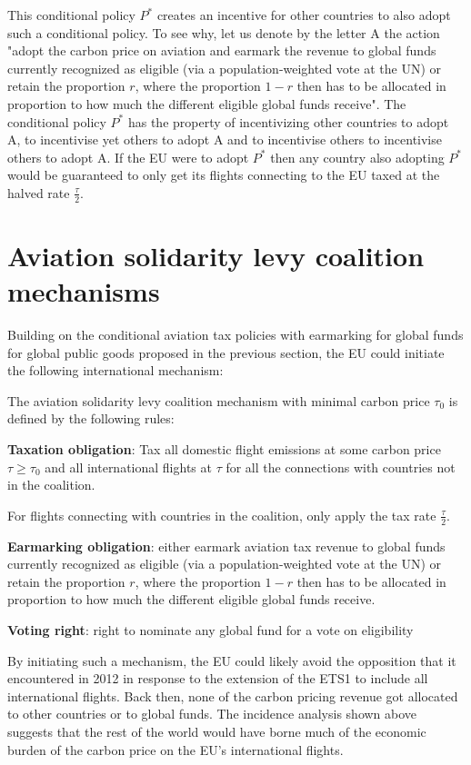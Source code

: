 This conditional policy $P^*$ creates an incentive for other countries to also adopt such a conditional policy. To see why, let us denote by the letter A the action "adopt the carbon price on aviation and earmark the revenue to global funds currently recognized as eligible (via a population-weighted vote at the UN) or retain the proportion $r$, where the proportion $1-r$ then has to be allocated in proportion to how much the different eligible global funds receive". The conditional policy $P^*$ has the property of incentivizing other countries to adopt A, to incentivise yet others to adopt A and to incentivise others to incentivise others to adopt A. If the EU were to adopt $P^*$ then any country also adopting $P^*$  would be guaranteed to only get its flights connecting to the EU taxed at the halved rate $\frac{\tau}{2}$.

    
\section{Aviation solidarity levy coalition mechanisms}

Building on the conditional aviation tax policies with earmarking for global funds for global public goods proposed in the previous section, the EU could initiate the following international mechanism:

\begin{definition}
The aviation solidarity levy coalition mechanism with minimal carbon price $\tau_0$ is defined by the following rules:

\textbf{Taxation obligation}: Tax all domestic flight emissions at some carbon price $\tau \geq \tau_0$  and all international flights at $\tau$ for all the connections with countries not in the coalition.

For flights connecting with countries in the coalition, only apply the tax rate $\frac{\tau }{2}$.

\textbf{Earmarking obligation}: either earmark aviation tax revenue to global funds currently recognized as eligible (via a population-weighted vote at the UN) or retain the proportion $r$, where the proportion $1-r$ then has to be allocated in proportion to how much the different eligible global funds receive.

\textbf{Voting right}: right to nominate any global fund for a vote on eligibility
\end{definition}
By initiating such a mechanism, the EU could likely avoid the opposition that it encountered in 2012 in response to the extension of the ETS1 to include all international flights. Back then, none of the carbon pricing revenue got allocated to other countries or to global funds. The incidence analysis shown above suggests that the rest of the world would have borne much of the economic burden of the carbon price on the EU's international flights. 

